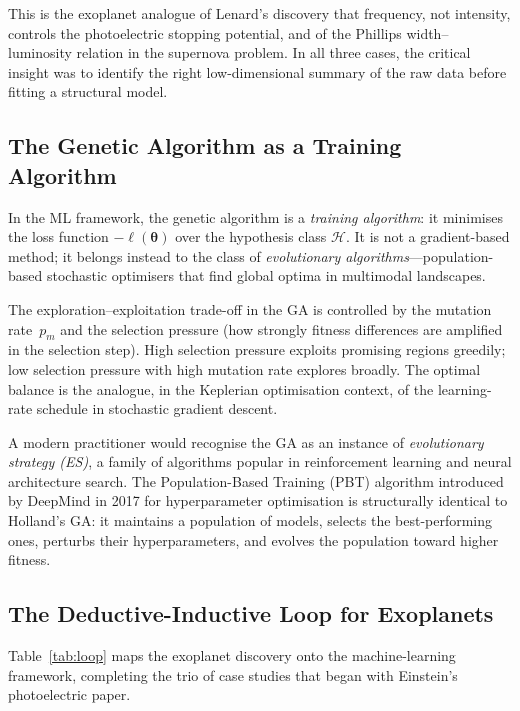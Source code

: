 \documentclass[12pt]{article}
\begin{document}
This is the exoplanet analogue of Lenard's discovery that frequency,
not intensity, controls the photoelectric stopping potential, and of
the Phillips width--luminosity relation in the supernova problem.  In
all three cases, the critical insight was to identify the right
low-dimensional summary of the raw data before fitting a structural model.

\subsection{The Genetic Algorithm as a Training Algorithm}

In the ML framework, the genetic algorithm is a \emph{training
algorithm}: it minimises the loss function $-\ell(\boldsymbol\theta)$
over the hypothesis class $\mathcal{H}$.  It is not a gradient-based
method; it belongs instead to the class of \emph{evolutionary
algorithms}---population-based stochastic optimisers that find global
optima in multimodal landscapes.

The exploration--exploitation trade-off in the GA is controlled by the
mutation rate~$p_m$ and the selection pressure (how strongly
fitness differences are amplified in the selection step).  High
selection pressure exploits promising regions greedily; low selection
pressure with high mutation rate explores broadly.  The optimal balance
is the analogue, in the Keplerian optimisation context, of the
learning-rate schedule in stochastic gradient descent.

A modern practitioner would recognise the GA as an instance of
\emph{evolutionary strategy (ES)}, a family of algorithms popular in
reinforcement learning and neural architecture search.  The
Population-Based Training (PBT) algorithm introduced by DeepMind in
2017 for hyperparameter optimisation is structurally identical to
Holland's GA: it maintains a population of models, selects the
best-performing ones, perturbs their hyperparameters, and evolves
the population toward higher fitness.

\subsection{The Deductive-Inductive Loop for Exoplanets}

Table~\ref{tab:loop} maps the exoplanet discovery onto the
machine-learning framework, completing the trio of case studies that
began with Einstein's photoelectric paper.
\end{document}
